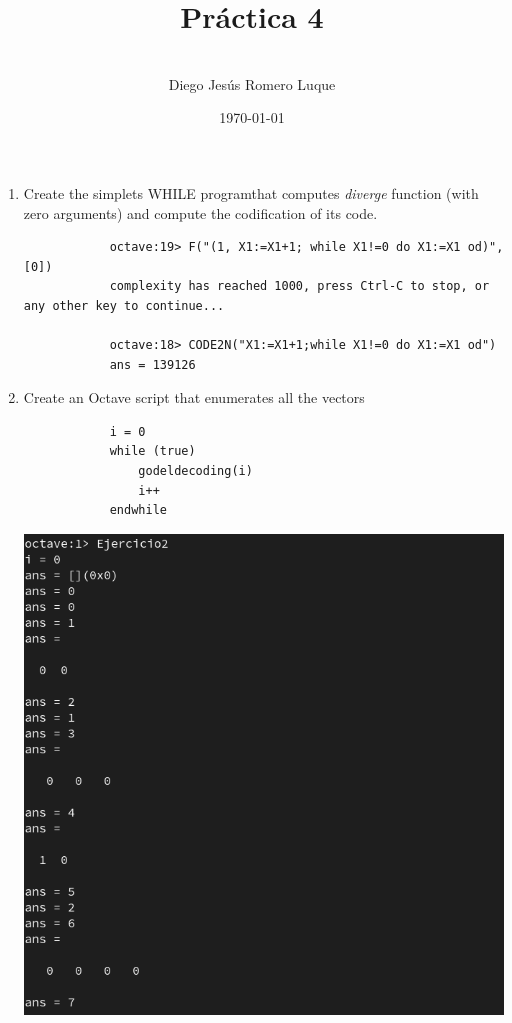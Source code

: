 \documentclass{article}
\title{\textbf{Pr\'actica 4}}
\author{\\Diego Jes\'us Romero Luque}
\date{\today}
\begin{document}
\maketitle
\pagebreak
\begin{enumerate}
    \item Create the simplets WHILE programthat computes \textit{diverge} function 
        (with zero arguments) and compute the codification of its code.
        \begin{verbatim}
            octave:19> F("(1, X1:=X1+1; while X1!=0 do X1:=X1 od)", [0])
            complexity has reached 1000, press Ctrl-C to stop, or any other key to continue...
            
            octave:18> CODE2N("X1:=X1+1;while X1!=0 do X1:=X1 od")
            ans = 139126
        \end{verbatim}
    \pagebreak
    \item Create an Octave script that enumerates all the vectors
        \begin{verbatim}
            i = 0
            while (true)
                godeldecoding(i)
                i++
            endwhile
        \end{verbatim}
        \includegraphics[scale=0.35]{Ej2.png}


\end{enumerate}
\end{document}
